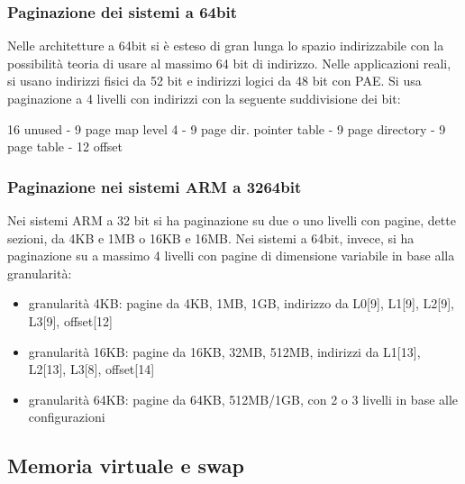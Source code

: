 \documentclass[a4paper]{article}
\begin{document}
\subsubsection*{Paginazione dei sistemi a 64bit}
Nelle architetture a 64bit si è esteso di gran lunga lo spazio indirizzabile con la possibilità teoria di usare al massimo 64
bit di indirizzo. Nelle applicazioni reali, si usano indirizzi fisici da 52 bit e indirizzi logici da 48 bit con PAE. Si
usa paginazione a 4 livelli con indirizzi con la seguente suddivisione dei bit:
\begin{center}
	\vspace{-5pt}
	16 unused - 9 page map level 4 - 9 page dir. pointer table - 9 page directory - 9 page table - 12 offset
	\vspace{-5pt}
\end{center}

\subsubsection*{Paginazione nei sistemi ARM a 3264bit}
Nei sistemi ARM a 32 bit si ha paginazione su due o uno livelli con pagine, dette sezioni, da 4KB e 1MB o 16KB e 16MB. Nei sistemi
a 64bit, invece, si ha paginazione su a massimo 4 livelli con pagine di dimensione variabile in base alla granularità:
\begin{itemize}
	\item granularità 4KB: pagine da 4KB, 1MB, 1GB, indirizzo da L0[9], L1[9], L2[9], L3[9], offset[12]
	\item granularità 16KB: pagine da 16KB, 32MB, 512MB, indirizzi da L1[13], L2[13],  L3[8], offset[14]
	\item granularità 64KB: pagine da 64KB, 512MB/1GB, con 2 o 3 livelli in base alle configurazioni
\end{itemize}


\subsection{Memoria virtuale e swap}
\end{document}
